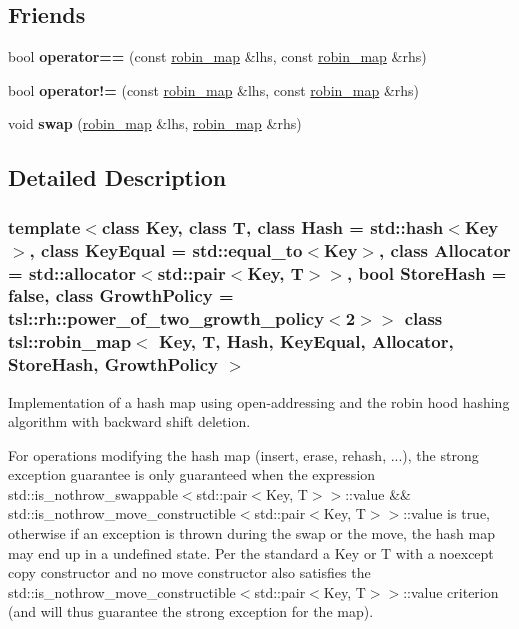 \subsection*{Friends}
\begin{DoxyCompactItemize}
\item 
\mbox{\label{classtsl_1_1robin__map_a6f9f96c16441c4c025b121d944fdc026}} 
bool {\bfseries operator==} (const \mbox{\hyperlink{classtsl_1_1robin__map}{robin\+\_\+map}} \&lhs, const \mbox{\hyperlink{classtsl_1_1robin__map}{robin\+\_\+map}} \&rhs)
\item 
\mbox{\label{classtsl_1_1robin__map_a0bce684f2a3901680d3def8db9f92471}} 
bool {\bfseries operator!=} (const \mbox{\hyperlink{classtsl_1_1robin__map}{robin\+\_\+map}} \&lhs, const \mbox{\hyperlink{classtsl_1_1robin__map}{robin\+\_\+map}} \&rhs)
\item 
\mbox{\label{classtsl_1_1robin__map_a614982dcc0873a246c7cfca6395c6d8f}} 
void {\bfseries swap} (\mbox{\hyperlink{classtsl_1_1robin__map}{robin\+\_\+map}} \&lhs, \mbox{\hyperlink{classtsl_1_1robin__map}{robin\+\_\+map}} \&rhs)
\end{DoxyCompactItemize}


\subsection{Detailed Description}
\subsubsection*{template$<$class Key, class T, class Hash = std\+::hash$<$\+Key$>$, class Key\+Equal = std\+::equal\+\_\+to$<$\+Key$>$, class Allocator = std\+::allocator$<$std\+::pair$<$\+Key, T$>$$>$, bool Store\+Hash = false, class Growth\+Policy = tsl\+::rh\+::power\+\_\+of\+\_\+two\+\_\+growth\+\_\+policy$<$2$>$$>$\newline
class tsl\+::robin\+\_\+map$<$ Key, T, Hash, Key\+Equal, Allocator, Store\+Hash, Growth\+Policy $>$}

Implementation of a hash map using open-\/addressing and the robin hood hashing algorithm with backward shift deletion.

For operations modifying the hash map (insert, erase, rehash, ...), the strong exception guarantee is only guaranteed when the expression {\ttfamily std\+::is\+\_\+nothrow\+\_\+swappable$<$std\+::pair$<$Key, T$>$$>$\+::value \&\& std\+::is\+\_\+nothrow\+\_\+move\+\_\+constructible$<$std\+::pair$<$Key, T$>$$>$\+::value} is true, otherwise if an exception is thrown during the swap or the move, the hash map may end up in a undefined state. Per the standard a {\ttfamily Key} or {\ttfamily T} with a noexcept copy constructor and no move constructor also satisfies the {\ttfamily std\+::is\+\_\+nothrow\+\_\+move\+\_\+constructible$<$std\+::pair$<$Key, T$>$$>$\+::value} criterion (and will thus guarantee the strong exception for the map).

